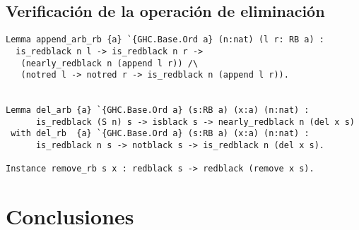\documentclass[letterpaper,12pt,oneside]{book}
\theoremstyle{plain}
\theoremstyle{definition}
\theoremstyle{remark}
\begin{document}
\section{Verificación de la operación de eliminación}
\begin{verbatim}
Lemma append_arb_rb {a} `{GHC.Base.Ord a} (n:nat) (l r: RB a) : 
  is_redblack n l -> is_redblack n r ->
   (nearly_redblack n (append l r)) /\
   (notred l -> notred r -> is_redblack n (append l r)).


Lemma del_arb {a} `{GHC.Base.Ord a} (s:RB a) (x:a) (n:nat) :
      is_redblack (S n) s -> isblack s -> nearly_redblack n (del x s)
 with del_rb  {a} `{GHC.Base.Ord a} (s:RB a) (x:a) (n:nat) :
      is_redblack n s -> notblack s -> is_redblack n (del x s).

Instance remove_rb s x : redblack s -> redblack (remove x s).
\end{verbatim}
\chapter{Conclusiones}  
\backmatter%
\end{document}
